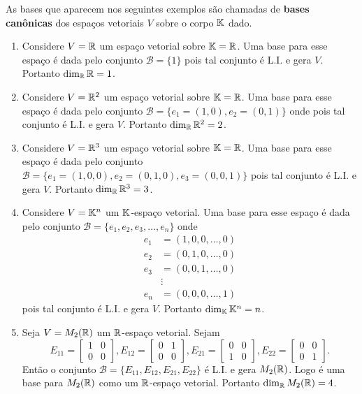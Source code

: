 As bases que aparecem nos seguintes exemplos são chamadas de \textbf{bases canônicas} dos espaços vetoriais $V$ sobre o corpo $\mathbb{K}$ dado.
\begin{exemplos}
  \begin{enumerate}
    \item Considere $V = \mathbb{R}$ um espaço vetorial sobre $\mathbb{K} = \mathbb{R}$. Uma base para esse espaço é dada pelo conjunto $\mathcal{B} = \{1\}$ pois tal conjunto é L.I. e gera $V$. Portanto $\dim_{\mathbb{R}}\mathbb{R} = 1$.

    \item Considere $V = \mathbb{R}^2$ um espaço vetorial sobre $\mathbb{K} = \mathbb{R}$. Uma base para esse espaço é dada pelo conjunto $\mathcal{B} = \{e_1 = (1, 0), e_2 = (0, 1)\}$ onde pois tal conjunto é L.I. e gera $V$. Portanto $\dim_{\mathbb{R}}\mathbb{R}^2 = 2$.

    \item Considere $V = \mathbb{R}^3$ um espaço vetorial sobre $\mathbb{K} = \mathbb{R}$. Uma base para esse espaço é dada pelo conjunto $\mathcal{B} = \{e_1 = (1, 0, 0), e_2 = (0, 1, 0), e_3 = (0, 0, 1)\}$ pois tal conjunto é L.I. e gera $V$. Portanto $\dim_{\mathbb{R}}\mathbb{R}^3 = 3$.

    \item Considere $V = \mathbb{K}^n$ um $\mathbb{K}$-espaço vetorial. Uma base para esse espaço é dada pelo conjunto $\mathcal{B} = \{e_1, e_2, e_3, \dots, e_n\}$ onde
      \begin{align*}
        e_1 &= (1, 0, 0, \dots, 0)\\
        e_2 &= (0, 1, 0, \dots, 0)\\
        e_3 &= (0, 0, 1, \dots, 0)\\
            &\vdots\\
        e_n &= (0, 0, 0, \dots, 1)
      \end{align*}
      pois tal conjunto é L.I. e gera $V$. Portanto $\dim_{\mathbb{K}}\mathbb{K}^n = n$.

    \item Seja $V = M_2(\mathbb{R})$ um $\mathbb{R}$-espaço vetorial. Sejam
      \[
        E_{11} = \begin{bmatrix}1 & 0\\0 & 0\end{bmatrix},
        E_{12} = \begin{bmatrix}0 & 1\\0 & 0\end{bmatrix},
        E_{21} = \begin{bmatrix}0 & 0\\1 & 0\end{bmatrix},
        E_{22} = \begin{bmatrix}0 & 0\\0 & 1\end{bmatrix}.
      \]
      Então o conjunto $\mathcal{B} = \{E_{11}, E_{12}, E_{21}, E_{22}\}$ é L.I. e gera $M_2(\mathbb{R})$. Logo é uma base para $M_2(\mathbb{R})$ como um $\mathbb{R}$-espaço vetorial. Portanto $\dim_{\mathbb{R}} M_2(\mathbb{R}) = 4$.


\end{enumerate}
\end{exemplos}
